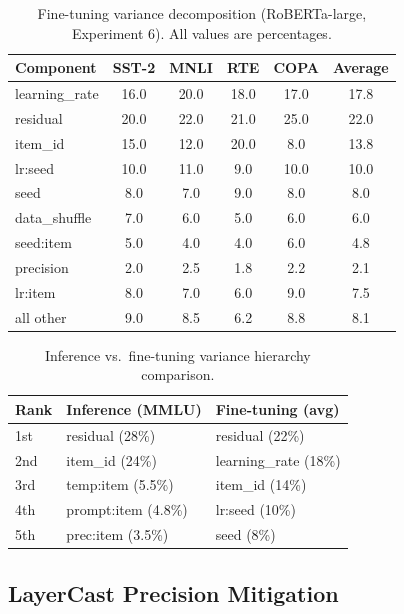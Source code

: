 \documentclass[letterpaper]{article}
\begin{document}
\begin{table}[t]
\centering
\caption{Fine-tuning variance decomposition (RoBERTa-large, Experiment 6). All values are percentages.}
\label{tab:finetune}
\small
\begin{tabular}{lccccc}
\toprule
Component & SST-2 & MNLI & RTE & COPA & Average \\
\midrule
learning\_rate & 16.0 & 20.0 & 18.0 & 17.0 & 17.8 \\
residual       & 20.0 & 22.0 & 21.0 & 25.0 & 22.0 \\
item\_id       & 15.0 & 12.0 & 20.0 & 8.0  & 13.8 \\
lr:seed        & 10.0 & 11.0 & 9.0  & 10.0 & 10.0 \\
seed           & 8.0  & 7.0  & 9.0  & 8.0  & 8.0  \\
data\_shuffle  & 7.0  & 6.0  & 5.0  & 6.0  & 6.0  \\
seed:item      & 5.0  & 4.0  & 4.0  & 6.0  & 4.8  \\
precision      & 2.0  & 2.5  & 1.8  & 2.2  & 2.1  \\
lr:item        & 8.0  & 7.0  & 6.0  & 9.0  & 7.5  \\
all other      & 9.0  & 8.5  & 6.2  & 8.8  & 8.1  \\
\bottomrule
\end{tabular}
\end{table}

\begin{table}[t]
\centering
\caption{Inference vs.\ fine-tuning variance hierarchy comparison.}
\label{tab:inf_vs_ft}
\small
\begin{tabular}{lll}
\toprule
Rank & Inference (MMLU) & Fine-tuning (avg) \\
\midrule
1st & residual (28\%)     & residual (22\%) \\
2nd & item\_id (24\%)     & learning\_rate (18\%) \\
3rd & temp:item (5.5\%)   & item\_id (14\%) \\
4th & prompt:item (4.8\%) & lr:seed (10\%) \\
5th & prec:item (3.5\%)   & seed (8\%) \\
\bottomrule
\end{tabular}
\end{table}


\subsection{LayerCast Precision Mitigation}
\end{document}
